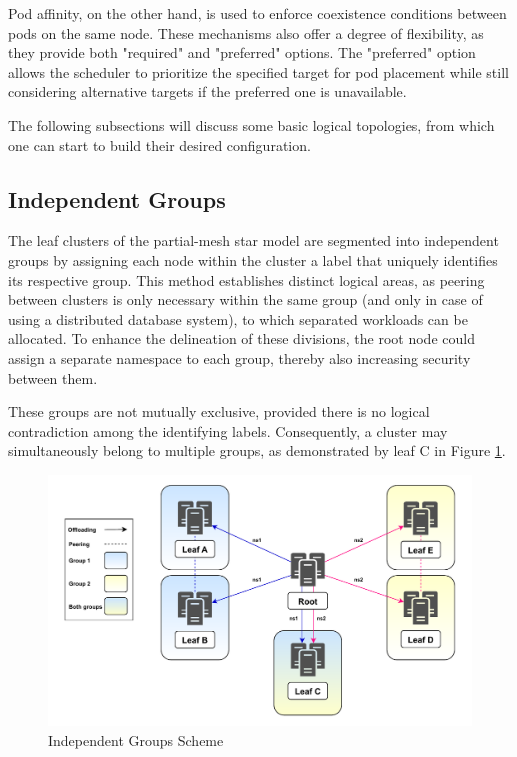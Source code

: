 Pod affinity, on the other hand, is used to enforce coexistence conditions between pods on the same node. These mechanisms also offer a degree of flexibility, as they provide both "required" and "preferred" options. The "preferred" option allows the scheduler to prioritize the specified target for pod placement while still considering alternative targets if the preferred one is unavailable.

The following subsections will discuss some basic logical topologies, from which one can start to build their desired configuration.

\subsection{Independent Groups}\label{sec:indipendent-groups}
The leaf clusters of the partial-mesh star model are segmented into independent groups by assigning each node within the cluster a label that uniquely identifies its respective group. This method establishes distinct logical areas, as peering between clusters is only necessary within the same group (and only in case of using a distributed database system), to which separated workloads can be allocated. To enhance the delineation of these divisions, the root node could assign a separate namespace to each group, thereby also increasing security between them.

These groups are not mutually exclusive, provided there is no logical contradiction among the identifying labels. Consequently, a cluster may simultaneously belong to multiple groups, as demonstrated by leaf C in Figure \ref{fig:group-ind}.

\begin{figure}[ht]\centering
\includegraphics[scale=0.7]{Pictures/Group-v6}
\caption{Independent Groups Scheme}\label{fig:group-ind}
\end{figure}

